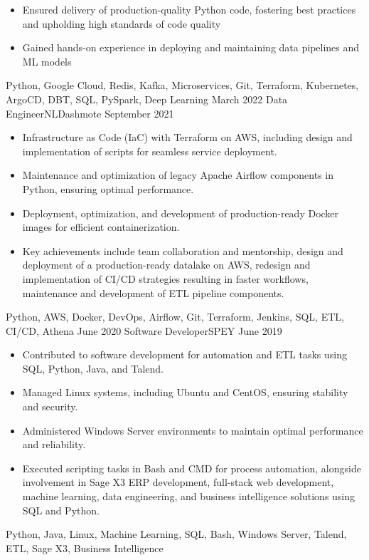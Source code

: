 \begin{experiences}
{\begin{itemize}
      \item Ensured delivery of production-quality Python code, fostering best practices and upholding high standards of code quality
      \item Gained hands-on experience in deploying and maintaining data pipelines and ML models
    \end{itemize}
  }
  {Python, Google Cloud, Redis, Kafka, Microservices, Git, Terraform, Kubernetes, ArgoCD, DBT, SQL, PySpark, Deep Learning}
  \emptySeparator
  \experience
  {March 2022}   {Data Engineer}{NL}{Dashmote}
  {September 2021} {
    \begin{itemize}
      \item Infrastructure as Code (IaC) with Terraform on AWS, including design and implementation of scripts for seamless service deployment.
      \item Maintenance and optimization of legacy Apache Airflow components in Python, ensuring optimal performance.
      \item Deployment, optimization, and development of production-ready Docker images for efficient containerization.
      \item Key achievements include team collaboration and mentorship, design and deployment of a production-ready datalake on AWS, redesign and implementation of CI/CD strategies resulting in faster workflows, maintenance and development of ETL pipeline components.

    \end{itemize}
  }
  {Python, AWS, Docker, DevOps, Airflow, Git, Terraform, Jenkins, SQL, ETL, CI/CD, Athena}
  \emptySeparator
  \experience
  {June 2020}   {Software Developer}{SP}{EY}
  {June 2019} {
    \begin{itemize}
      \item Contributed to software development for automation and ETL tasks using SQL, Python, Java, and Talend.
      \item Managed Linux systems, including Ubuntu and CentOS, ensuring stability and security.
      \item Administered Windows Server environments to maintain optimal performance and reliability.
      \item Executed scripting tasks in Bash and CMD for process automation, alongside involvement in Sage X3 ERP development, full-stack web development, machine learning, data engineering, and business intelligence solutions using SQL and Python.
    \end{itemize}
  }
  {Python, Java, Linux, Machine Learning, SQL, Bash, Windows Server, Talend, ETL, Sage X3, Business Intelligence}
  \emptySeparator
\end{experiences}
